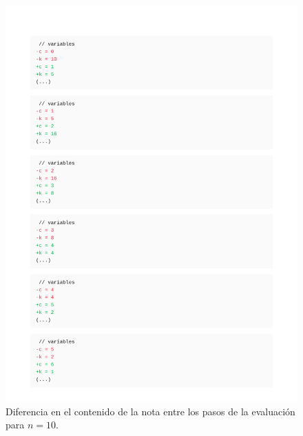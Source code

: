 \begin{figure}[h]
    \centering
    \includegraphics[width=1.0\textwidth]{figures/clltz_logs_10.pdf}
    \caption{Diferencia en el contenido de la nota entre los pasos de la evaluación para $n=10$.}
    \label{fig:collatz_diff}
\end{figure}